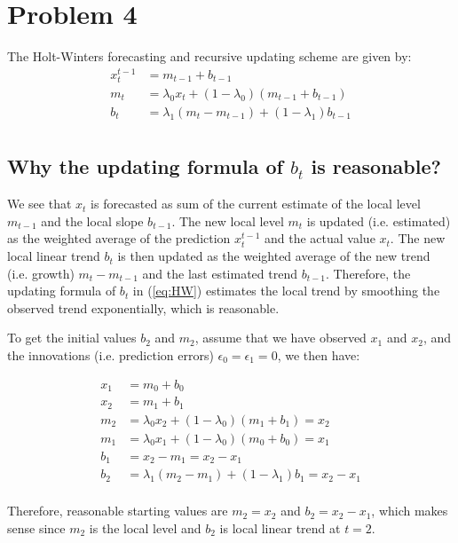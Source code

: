 \section{Problem 4}
The Holt-Winters forecasting and recursive updating scheme are given by:
\begin{equation}
\begin{split} \label{eq:HW}
x^{t-1}_t &= m_{t-1} + b_{t-1}\\
m_t &= \lambda_0x_t + (1-\lambda_0)(m_{t-1}+b_{t-1})\\
b_t &= \lambda_1(m_t - m_{t-1}) + (1-\lambda_1)b_{t-1}  \\
\end{split}
\end{equation}
\subsection{Why the updating formula of $b_t$ is reasonable?}
We see that $x_t$ is forecasted as sum of the current estimate of the local level $m_{t-1}$ and the local slope $b_{t-1}$. The new local level $m_t$ is updated (i.e. estimated) as the weighted average of the prediction $x^{t-1}_t$ and the actual value $x_t$. The new local linear trend $b_t$ is then updated as the weighted average of the new trend (i.e. growth) $m_t - m_{t-1}$ and the last estimated trend $b_{t-1}$. Therefore, the updating formula of $b_t$ in (\ref{eq:HW}) estimates the local trend by smoothing the observed trend exponentially, which is reasonable.

To get the initial values $b_2$ and $m_2$, assume that we have observed $x_1$ and $x_2$, and the innovations (i.e. prediction errors) $\epsilon_0 = \epsilon_1 = 0$, we then have:

\begin{equation}
\begin{split}
x_1 &= m_0 + b_0\\
x_2 &= m_1 + b_1\\
m_2 &= \lambda_0 x_2 + (1-\lambda_0) (m_1 + b_1) = x_2\\
m_1 &= \lambda_0 x_1 + (1-\lambda_0) (m_0 + b_0) = x_1\\
b_1 &= x_2 - m_1 = x_2 - x_1\\
b_2 &= \lambda_1 (m_2 - m_1) + (1-\lambda_1)b_1 = x_2 - x_1\\
\end{split}
\end{equation}

Therefore, reasonable starting values are $m_2 = x_2$ and $b_2 = x_2 - x_1$,  which makes sense since $m_2$ is the local level and $b_2$ is local linear trend at $t = 2$.

